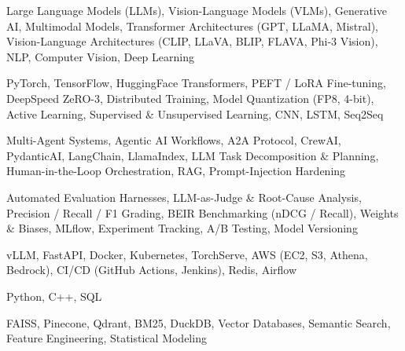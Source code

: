 \documentclass[letter,10pt]{article}
\begin{document}
 Large Language Models (LLMs), Vision-Language Models (VLMs), Generative AI, Multimodal Models, Transformer Architectures (GPT, LLaMA, Mistral), Vision-Language Architectures (CLIP, LLaVA, BLIP, FLAVA, Phi-3 Vision), NLP, Computer Vision, Deep Learning\par\vspace{2pt}

 PyTorch, TensorFlow, HuggingFace Transformers, PEFT / LoRA Fine-tuning, DeepSpeed ZeRO-3, Distributed Training, Model Quantization (FP8, 4-bit), Active Learning, Supervised \& Unsupervised Learning, CNN, LSTM, Seq2Seq\par\vspace{2pt}

 Multi-Agent Systems, Agentic AI Workflows, A2A Protocol, CrewAI, PydanticAI, LangChain, LlamaIndex, LLM Task Decomposition \& Planning, Human-in-the-Loop Orchestration, RAG, Prompt-Injection Hardening\par\vspace{2pt}

 Automated Evaluation Harnesses, LLM-as-Judge \& Root-Cause Analysis, Precision / Recall / F1 Grading, BEIR Benchmarking (nDCG / Recall), Weights \& Biases, MLflow, Experiment Tracking, A/B Testing, Model Versioning\par\vspace{2pt}

 vLLM, FastAPI, Docker, Kubernetes, TorchServe, AWS (EC2, S3, Athena, Bedrock), CI/CD (GitHub Actions, Jenkins), Redis, Airflow\par\vspace{2pt}

 Python, C++, SQL\par\vspace{2pt}

 FAISS, Pinecone, Qdrant, BM25, DuckDB, Vector Databases, Semantic Search, Feature Engineering, Statistical Modeling
\end{document}
